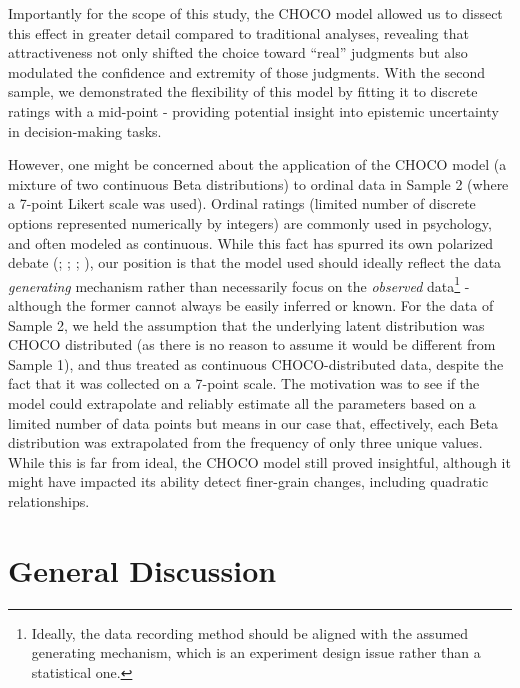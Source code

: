 \documentclass[
  jou,
  floatsintext,
  longtable,
  nolmodern,
  notxfonts,
  notimes,
  colorlinks=true,linkcolor=blue,citecolor=blue,urlcolor=blue]{apa7}
\begin{document}
Importantly for the scope of this study, the CHOCO model allowed us to
dissect this effect in greater detail compared to traditional analyses,
revealing that attractiveness not only shifted the choice toward
``real'' judgments but also modulated the confidence and extremity of
those judgments. With the second sample, we demonstrated the flexibility
of this model by fitting it to discrete ratings with a mid-point -
providing potential insight into epistemic uncertainty in
decision-making tasks.

However, one might be concerned about the application of the CHOCO model
(a mixture of two continuous Beta distributions) to ordinal data in
Sample 2 (where a 7-point Likert scale was used). Ordinal ratings
(limited number of discrete options represented numerically by integers)
are commonly used in psychology, and often modeled as continuous. While
this fact has spurred its own polarized debate
(;
;
;
), our
position is that the model used should ideally reflect the data
\emph{generating} mechanism rather than necessarily focus on the
\emph{observed} data\footnote{Ideally, the data recording method should
  be aligned with the assumed generating mechanism, which is an
  experiment design issue rather than a statistical one.} - although the
former cannot always be easily inferred or known. For the data of Sample
2, we held the assumption that the underlying latent distribution was
CHOCO distributed (as there is no reason to assume it would be different
from Sample 1), and thus treated as continuous CHOCO-distributed data,
despite the fact that it was collected on a 7-point scale. The
motivation was to see if the model could extrapolate and reliably
estimate all the parameters based on a limited number of data points but
means in our case that, effectively, each Beta distribution was
extrapolated from the frequency of only three unique values. While this
is far from ideal, the CHOCO model still proved insightful, although it
might have impacted its ability detect finer-grain changes, including
quadratic relationships.

\section{General Discussion}\label{general-discussion}
\end{document}
